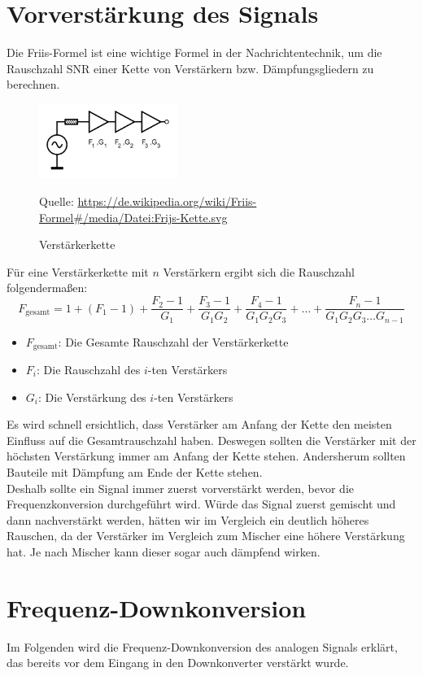 \section{Vorverstärkung des Signals} %
Die Friis-Formel ist eine wichtige Formel in der Nachrichtentechnik, um die Rauschzahl SNR einer Kette von Verstärkern
bzw. Dämpfungsgliedern zu berechnen.

\begin{figure}[H]
    \centering
    \includegraphics[width=0.4\textwidth]{Pictures/Frijs-Kette.svg.png}
    \caption{Verstärkerkette}
    \footnotesize{Quelle: \url{https://de.wikipedia.org/wiki/Friis-Formel#/media/Datei:Frijs-Kette.svg}}
\end{figure}
Für eine Verstärkerkette mit $n$ Verstärkern ergibt sich die Rauschzahl folgendermaßen:
\begin{equation}
    F_{\text{gesamt}} = 1 + (F_1 - 1) + \frac{F_2 - 1}{G_1} + \frac{F_3 - 1}{G_1 G_2} + \frac{F_4 - 1}{G_1 G_2 G_3} + \dots + \frac{F_n - 1}{G_1 G_2 G_3 \dots G_{n-1}}
\end{equation}
\begin{itemize}
    \item $F_{\text{gesamt}}$: Die Gesamte Rauschzahl der Verstärkerkette
    \item $F_i$: Die Rauschzahl des $i$-ten Verstärkers
    \item $G_i$: Die Verstärkung des $i$-ten Verstärkers
\end{itemize}
Es wird schnell ersichtlich, dass Verstärker am Anfang der Kette den meisten Einfluss auf die Gesamtrauschzahl haben.
Deswegen sollten die Verstärker mit der höchsten Verstärkung immer am Anfang der Kette stehen. Andersherum sollten Bauteile mit Dämpfung am Ende der Kette stehen.
\\
Deshalb sollte ein Signal immer zuerst vorverstärkt werden, bevor die Frequenzkonversion durchgeführt wird.
Würde das Signal zuerst gemischt und dann nachverstärkt werden, hätten wir im Vergleich ein deutlich höheres Rauschen,
da der Verstärker im Vergleich zum Mischer eine höhere Verstärkung hat. Je nach Mischer kann dieser sogar auch dämpfend wirken.
\section{Frequenz-Downkonversion} %
Im Folgenden wird die Frequenz-Downkonversion des analogen Signals erklärt, das bereits vor dem Eingang in den Downkonverter verstärkt wurde.
